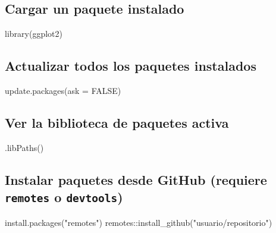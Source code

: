\documentclass[
  man,
  floatsintext,
  longtable,
  a4paper,
  nolmodern,
  notxfonts,
  notimes,
  12pt,
  colorlinks=true,linkcolor=blue,citecolor=blue,urlcolor=blue]{apa7}
\newenvironment{Shaded}{\begin{snugshade}}{\end{snugshade}}
\newcommand{\AttributeTok}[1]{\textcolor[rgb]{0.40,0.45,0.13}{#1}}
\newcommand{\ConstantTok}[1]{\textcolor[rgb]{0.56,0.35,0.01}{#1}}
\newcommand{\FunctionTok}[1]{\textcolor[rgb]{0.28,0.35,0.67}{#1}}
\newcommand{\NormalTok}[1]{\textcolor[rgb]{0.00,0.23,0.31}{#1}}
\newcommand{\SpecialCharTok}[1]{\textcolor[rgb]{0.37,0.37,0.37}{#1}}
\newcommand{\StringTok}[1]{\textcolor[rgb]{0.13,0.47,0.30}{#1}}
\begin{document}
\subsection{Cargar un paquete
instalado}\label{cargar-un-paquete-instalado}

\begin{Shaded}
\begin{Highlighting}[]
\FunctionTok{library}\NormalTok{(ggplot2)}
\end{Highlighting}
\end{Shaded}

\subsection{Actualizar todos los paquetes
instalados}\label{actualizar-todos-los-paquetes-instalados}

\begin{Shaded}
\begin{Highlighting}[]
\FunctionTok{update.packages}\NormalTok{(}\AttributeTok{ask =} \ConstantTok{FALSE}\NormalTok{)}
\end{Highlighting}
\end{Shaded}

\subsection{Ver la biblioteca de paquetes
activa}\label{ver-la-biblioteca-de-paquetes-activa}

\begin{Shaded}
\begin{Highlighting}[]
\FunctionTok{.libPaths}\NormalTok{()}
\end{Highlighting}
\end{Shaded}

\subsection{\texorpdfstring{Instalar paquetes desde GitHub (requiere
\texttt{remotes} o
\texttt{devtools})}{Instalar paquetes desde GitHub (requiere remotes o devtools)}}\label{instalar-paquetes-desde-github-requiere-remotes-o-devtools}

\begin{Shaded}
\begin{Highlighting}[]
\FunctionTok{install.packages}\NormalTok{(}\StringTok{"remotes"}\NormalTok{)}
\NormalTok{remotes}\SpecialCharTok{::}\FunctionTok{install\_github}\NormalTok{(}\StringTok{"usuario/repositorio"}\NormalTok{)}
\end{Highlighting}
\end{Shaded}
\end{document}
